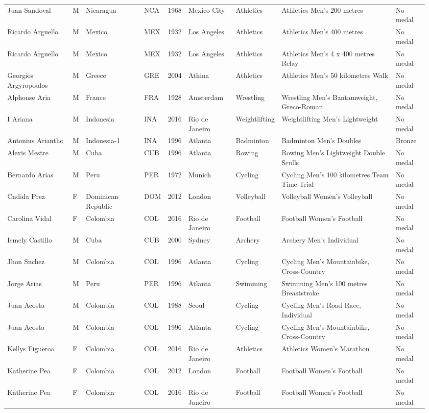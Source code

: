 \documentclass{article}%
\begin{document}
\begin{longtable}{l l l l l l l l l}
Juan Sandoval&M&Nicaragua&NCA&1968&Mexico City&Athletics&Athletics Men's 200 metres&No medal\\%
Ricardo Arguello&M&Mexico&MEX&1932&Los Angeles&Athletics&Athletics Men's 400 metres&No medal\\%
Ricardo Arguello&M&Mexico&MEX&1932&Los Angeles&Athletics&Athletics Men's 4 x 400 metres Relay&No medal\\%
Georgios Argyropoulos&M&Greece&GRE&2004&Athina&Athletics&Athletics Men's 50 kilometres Walk&No medal\\%
Alphonse Aria&M&France&FRA&1928&Amsterdam&Wrestling&Wrestling Men's Bantamweight, Greco{-}Roman&No medal\\%
I Ariana&M&Indonesia&INA&2016&Rio de Janeiro&Weightlifting&Weightlifting Men's Lightweight&No medal\\%
Antonius Ariantho&M&Indonesia{-}1&INA&1996&Atlanta&Badminton&Badminton Men's Doubles&Bronze\\%
Alexis Mestre&M&Cuba&CUB&1996&Atlanta&Rowing&Rowing Men's Lightweight Double Sculls&No medal\\%
Bernardo Arias&M&Peru&PER&1972&Munich&Cycling&Cycling Men's 100 kilometres Team Time Trial&No medal\\%
Cndida Prez&F&Dominican Republic&DOM&2012&London&Volleyball&Volleyball Women's Volleyball&No medal\\%
Carolina Vidal&F&Colombia&COL&2016&Rio de Janeiro&Football&Football Women's Football&No medal\\%
Ismely Castillo&M&Cuba&CUB&2000&Sydney&Archery&Archery Men's Individual&No medal\\%
Jhon Snchez&M&Colombia&COL&1996&Atlanta&Cycling&Cycling Men's Mountainbike, Cross{-}Country&No medal\\%
Jorge Arias&M&Peru&PER&1996&Atlanta&Swimming&Swimming Men's 100 metres Breaststroke&No medal\\%
Juan Acosta&M&Colombia&COL&1988&Seoul&Cycling&Cycling Men's Road Race, Individual&No medal\\%
Juan Acosta&M&Colombia&COL&1996&Atlanta&Cycling&Cycling Men's Mountainbike, Cross{-}Country&No medal\\%
Kellys Figueroa&F&Colombia&COL&2016&Rio de Janeiro&Athletics&Athletics Women's Marathon&No medal\\%
Katherine Pea&F&Colombia&COL&2012&London&Football&Football Women's Football&No medal\\%
Katherine Pea&F&Colombia&COL&2016&Rio de Janeiro&Football&Football Women's Football&No medal\\%

\end{longtable}
\end{document}
